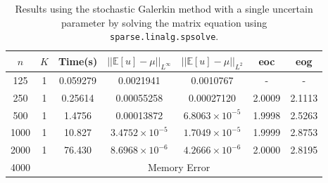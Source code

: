 \documentclass[11pt]{article}
\numberwithin{equation}{section}
\begin{document}
\begin{table}[H]
\centering
\begin{tabular}{|c|c|c|c|c|c|c|}
\hline
$n$ & $K$ & Time(s) & $|| \mathbb{E}[u] - \mu ||_{L^{\infty}}$ & $|| \mathbb{E}[u] - \mu ||_{L^{2}}$ & eoc & eog \\
\hline
125 & 1 & 0.059279 & 0.0021941 & 0.0010767 & - & - \\
250 & 1 & 0.25614 & 0.00055258 & 0.00027120 & 2.0009 & 2.1113 \\
500 & 1 & 1.4756 & 0.00013872 & $6.8063 \times 10^{-5}$ & 1.9998 & 2.5263 \\
1000 & 1 & 10.827 & $3.4752 \times 10^{-5}$ & $1.7049 \times 10^{-5}$ & 1.9999 & 2.8753 \\
2000 & 1 & 76.430 & $8.6968 \times 10^{-6}$ & $4.2666 \times 10^{-6}$ & 2.0000 & 2.8195 \\
\cline{2-7}
4000 & \multicolumn{6}{c|}{Memory Error} \\
\hline
\end{tabular}
\captionsetup{justification=centering}
\caption{Results using the stochastic Galerkin method with a single uncertain parameter by solving the matrix equation using \texttt{sparse.linalg.spsolve}.}
\label{table:stochastic matrix}
\end{table}
\end{document}
